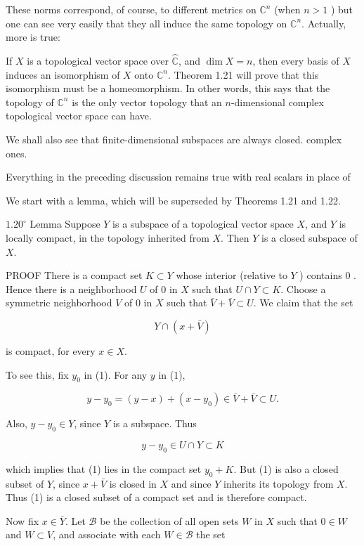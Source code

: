 \documentclass[10pt]{article}
\begin{document}
These norms correspond, of course, to different metrics on $\mathbb{C}^{n}$ (when $n>1$ ) but one can see very easily that they all induce the same topology on $\mathbb{C}^{n}$. Actually, more is true:

If $X$ is a topological vector space over $\overparen{\mathbb{C}}$, and $\operatorname{dim} X=n$, then every basis of $X$ induces an isomorphism of $X$ onto $\mathbb{C}^{n}$. Theorem 1.21 will prove that this isomorphism must be a homeomorphism. In other words, this says that the topology of $\mathbb{C}^{n}$ is the only vector topology that an $n$-dimensional complex topological vector space can have.

We shall also see that finite-dimensional subspaces are always closed. complex ones.

Everything in the preceding discussion remains true with real scalars in place of

We start with a lemma, which will be superseded by Theorems 1.21 and 1.22.

$1.20^{\circ}$ Lemma Suppose $Y$ is a subspace of a topological vector space $X$, and $Y$ is locally compact, in the topology inherited from $X$. Then $Y$ is a closed subspace of $X$.

PROOF There is a compact set $K \subset Y$ whose interior (relative to $Y$ ) contains 0 . Hence there is a neighborhood $U$ of 0 in $X$ such that $U \cap Y \subset K$. Choose a symmetric neighborhood $V$ of 0 in $X$ such that $\bar{V}+\bar{V} \subset U$. We claim that the set

$$
Y \cap(x+\bar{V})
$$

is compact, for every $x \in X$.

To see this, fix $y_{0}$ in (1). For any $y$ in (1),

$$
y-y_{0}=(y-x)+\left(x-y_{0}\right) \in \bar{V}+\bar{V} \subset U .
$$

Also, $y-y_{0} \in Y$, since $Y$ is a subspace. Thus

$$
y-y_{0} \in U \cap Y \subset K
$$

which implies that (1) lies in the compact set $y_{0}+K$. But (1) is also a closed subset of $Y$, since $x+\bar{V}$ is closed in $X$ and since $Y$ inherits its topology from $X$. Thus (1) is a closed subset of a compact set and is therefore compact.

Now fix $x \in \bar{Y}$. Let $\mathscr{B}$ be the collection of all open sets $W$ in $X$ such that $0 \in W$ and $W \subset V$, and associate with each $W \in \mathscr{B}$ the set
\end{document}
